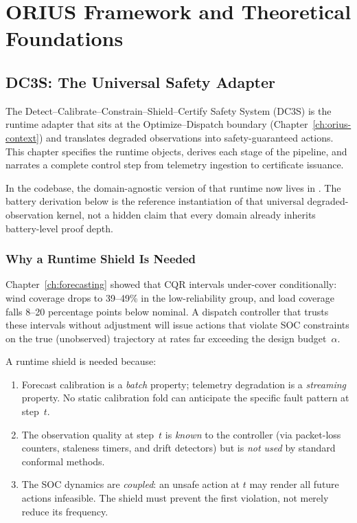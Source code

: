 \chapter{ORIUS Framework and Theoretical Foundations}
\label{ch:ch04_theoretical_foundations}
\label{ch:mathematical-foundations}


\section{DC3S: The Universal Safety Adapter}
\label{ch:dc3s-adapter}
\label{ch:dc3s}

The Detect--Calibrate--Constrain--Shield--Certify Safety System (DC3S) is the
runtime adapter that sits at the Optimize--Dispatch boundary
(Chapter~\ref{ch:orius-context}) and translates degraded observations
into safety-guaranteed actions.  This chapter specifies the runtime objects,
derives each stage of the pipeline, and narrates a complete control step from
telemetry ingestion to certificate issuance.

In the codebase, the domain-agnostic version of that runtime now lives in
.  The battery derivation below is the
reference instantiation of that universal degraded-observation kernel, not a
hidden claim that every domain already inherits battery-level proof depth.

\subsection{Why a Runtime Shield Is Needed}

Chapter~\ref{ch:forecasting} showed that CQR intervals under-cover
conditionally: wind coverage drops to 39--49\% in the low-reliability group,
and load coverage falls 8--20 percentage points below nominal.  A dispatch
controller that trusts these intervals without adjustment will issue actions
that violate SOC constraints on the true (unobserved) trajectory at rates far
exceeding the design budget~$\alpha$.

A runtime shield is needed because:
\begin{enumerate}
  \item Forecast calibration is a \emph{batch} property; telemetry degradation
    is a \emph{streaming} property.  No static calibration fold can anticipate
    the specific fault pattern at step~$t$.
  \item The observation quality at step~$t$ is \emph{known} to the controller
    (via packet-loss counters, staleness timers, and drift detectors) but is
    \emph{not used} by standard conformal methods.
  \item The SOC dynamics are \emph{coupled}: an unsafe action at $t$ may
    render all future actions infeasible.  The shield must prevent the
    first violation, not merely reduce its frequency.
\end{enumerate}

